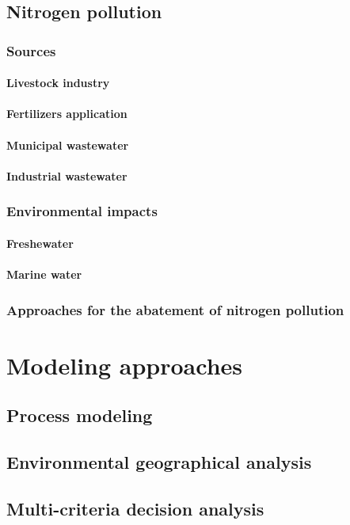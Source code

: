 \subsection{Nitrogen pollution}

\subsubsection{Sources}
\paragraph{Livestock industry}
\paragraph{Fertilizers application}
\paragraph{Municipal wastewater}
\paragraph{Industrial wastewater}

\subsubsection{Environmental impacts}

\paragraph{Freshewater}
\paragraph{Marine water}

\subsubsection{Approaches for the abatement of nitrogen pollution}





\section{Modeling approaches}
\subsection{Process modeling}
\subsection{Environmental geographical analysis}
\subsection{Multi-criteria decision analysis}
